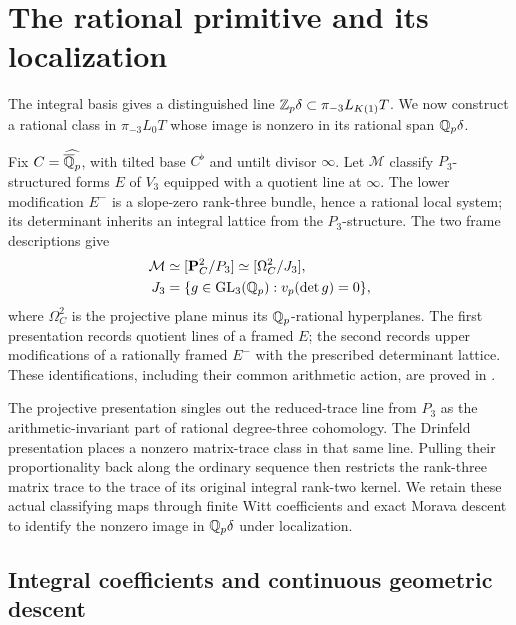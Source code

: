 \section{The rational primitive and its localization}\label{h3:sec:rational}

The integral basis gives a distinguished line
$\mathbb Z_p\delta\subset\pi_{-3}L_{K(1)}T$.  We now construct a rational
class in $\pi_{-3}L_0T$ whose image is nonzero in its rational span
$\mathbb Q_p\delta$.

Fix $C=\widehat{\overline{\mathbb Q}_p}$, with tilted base $C^\flat$ and
untilt divisor $\infty$.  Let $\mathcal M$ classify $P_3$-structured
forms $E$ of $V_3$ equipped with a quotient line at $\infty$.
The lower modification $E^-$ is a slope-zero rank-three bundle,
hence a rational local system; its determinant inherits an integral
lattice from the $P_3$-structure.  The two frame descriptions give
\[
 \begin{aligned}
 \mathcal M&\simeq[\mathbf P^2_C/P_3]\simeq[\Omega_C^2/J_3],\\
 J_3&=\{g\in\operatorname{GL}_3(\mathbb Q_p):v_p(\det g)=0\},
 \end{aligned}
\]
where $\Omega_C^2$ is the projective plane minus its
$\mathbb Q_p$-rational hyperplanes.  The first presentation records quotient
lines of a framed $E$; the second records upper modifications of a
rationally framed $E^-$ with the prescribed determinant lattice.
These identifications, including their common arithmetic action, are
proved in .

The projective presentation singles out the reduced-trace line from
$P_3$ as the arithmetic-invariant part of rational degree-three cohomology.
The Drinfeld presentation places a nonzero matrix-trace class in that
same line.  Pulling their proportionality back along the ordinary
sequence then restricts the rank-three matrix trace to the trace of
its original integral rank-two kernel.  We retain these actual
classifying maps through finite Witt coefficients and exact Morava
descent to identify the nonzero image in $\mathbb Q_p\delta$ under localization.

\subsection{Integral coefficients and continuous geometric descent}

